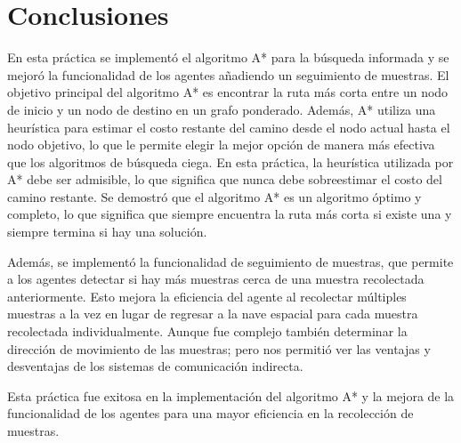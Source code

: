 \documentclass{article}
\begin{document}
\section{Conclusiones}
En esta práctica se implementó el algoritmo A* para la búsqueda informada y se mejoró la funcionalidad de los agentes añadiendo un seguimiento de muestras. El objetivo principal del algoritmo A* es encontrar la ruta más corta entre un nodo de inicio y un nodo de destino en un grafo ponderado. Además, A* utiliza una heurística para estimar el costo restante del camino desde el nodo actual hasta el nodo objetivo, lo que le permite elegir la mejor opción de manera más efectiva que los algoritmos de búsqueda ciega. En esta práctica, la heurística utilizada por A* debe ser admisible, lo que significa que nunca debe sobreestimar el costo del camino restante. Se demostró que el algoritmo A* es un algoritmo óptimo y completo, lo que significa que siempre encuentra la ruta más corta si existe una y siempre termina si hay una solución.

Además, se implementó la funcionalidad de seguimiento de muestras, que permite a los agentes detectar si hay más muestras cerca de una muestra recolectada anteriormente. Esto mejora la eficiencia del agente al recolectar múltiples muestras a la vez en lugar de regresar a la nave espacial para cada muestra recolectada individualmente. Aunque fue complejo también determinar la dirección de movimiento de las muestras; pero nos permitió ver las ventajas y desventajas de los sistemas de comunicación indirecta.

Esta práctica fue exitosa en la implementación del algoritmo A* y la mejora de la funcionalidad de los agentes para una mayor eficiencia en la recolección de muestras. 
\end{document}
